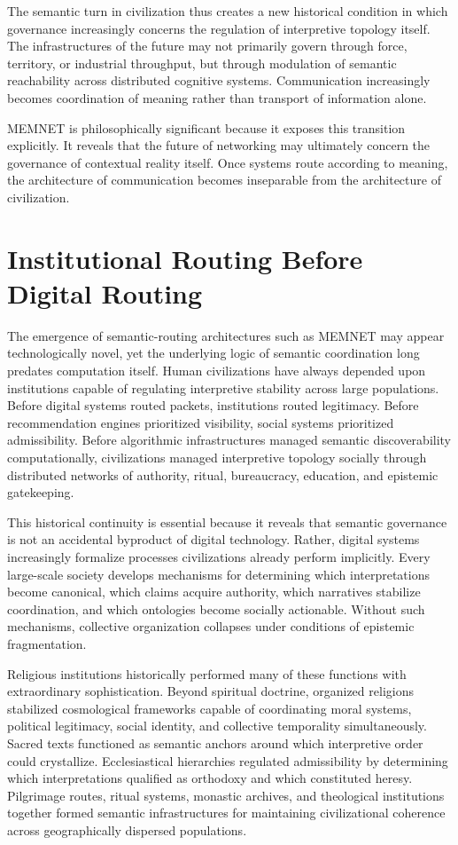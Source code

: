 \documentclass[11pt,a4paper]{article}
\begin{document}
The semantic turn in civilization thus creates a new historical condition in which governance increasingly concerns the regulation of interpretive topology itself. The infrastructures of the future may not primarily govern through force, territory, or industrial throughput, but through modulation of semantic reachability across distributed cognitive systems. Communication increasingly becomes coordination of meaning rather than transport of information alone.

MEMNET is philosophically significant because it exposes this transition explicitly. It reveals that the future of networking may ultimately concern the governance of contextual reality itself. Once systems route according to meaning, the architecture of communication becomes inseparable from the architecture of civilization.

\section{Institutional Routing Before Digital Routing}

The emergence of semantic-routing architectures such as MEMNET may appear technologically novel, yet the underlying logic of semantic coordination long predates computation itself. Human civilizations have always depended upon institutions capable of regulating interpretive stability across large populations. Before digital systems routed packets, institutions routed legitimacy. Before recommendation engines prioritized visibility, social systems prioritized admissibility. Before algorithmic infrastructures managed semantic discoverability computationally, civilizations managed interpretive topology socially through distributed networks of authority, ritual, bureaucracy, education, and epistemic gatekeeping.

This historical continuity is essential because it reveals that semantic governance is not an accidental byproduct of digital technology. Rather, digital systems increasingly formalize processes civilizations already perform implicitly. Every large-scale society develops mechanisms for determining which interpretations become canonical, which claims acquire authority, which narratives stabilize coordination, and which ontologies become socially actionable. Without such mechanisms, collective organization collapses under conditions of epistemic fragmentation.

Religious institutions historically performed many of these functions with extraordinary sophistication. Beyond spiritual doctrine, organized religions stabilized cosmological frameworks capable of coordinating moral systems, political legitimacy, social identity, and collective temporality simultaneously. Sacred texts functioned as semantic anchors around which interpretive order could crystallize. Ecclesiastical hierarchies regulated admissibility by determining which interpretations qualified as orthodoxy and which constituted heresy. Pilgrimage routes, ritual systems, monastic archives, and theological institutions together formed semantic infrastructures for maintaining civilizational coherence across geographically dispersed populations.
\end{document}
